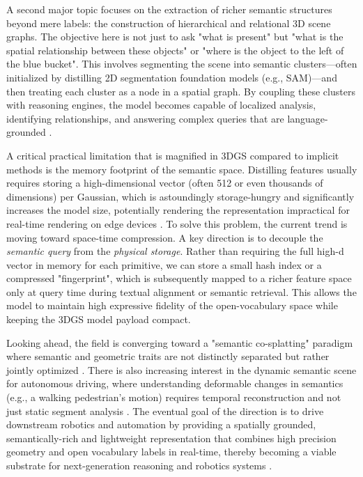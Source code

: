 \documentclass[11pt,a4paper]{article}
\begin{document}
A second major topic focuses on the extraction of richer semantic structures beyond mere labels: the construction of hierarchical and relational 3D scene graphs. The objective here is not just to ask "what is present" but "what is the spatial relationship between these objects" or "where is the object to the left of the blue bucket". This involves segmenting the scene into semantic clusters---often initialized by distilling 2D segmentation foundation models (e.g., SAM)---and then treating each cluster as a node in a spatial graph. By coupling these clusters with reasoning engines, the model becomes capable of localized analysis, identifying relationships, and answering complex queries that are language-grounded \cite{arxiv:2508.09977v5}.

A critical practical limitation that is magnified in 3DGS compared to implicit methods is the memory footprint of the semantic space. Distilling features usually requires storing a high-dimensional vector (often 512 or even thousands of dimensions) per Gaussian, which is astoundingly storage-hungry and significantly increases the model size, potentially rendering the representation impractical for real-time rendering on edge devices \cite{arxiv:2502.19457v1}. To solve this problem, the current trend is moving toward space-time compression. A key direction is to decouple the \emph{semantic query} from the \emph{physical storage}. Rather than requiring the full high-d vector in memory for each primitive, we can store a small hash index or a compressed "fingerprint", which is subsequently mapped to a richer feature space only at query time during textual alignment or semantic retrieval. This allows the model to maintain high expressive fidelity of the open-vocabulary space while keeping the 3DGS model payload compact.

Looking ahead, the field is converging toward a "semantic co-splatting" paradigm where semantic and geometric traits are not distinctly separated but rather jointly optimized \cite{arxiv:2508.09977v5}. There is also increasing interest in the dynamic semantic scene for autonomous driving, where understanding deformable changes in semantics (e.g., a walking pedestrian's motion) requires temporal reconstruction and not just static segment analysis \cite{arxiv:2411.16816v3,arxiv:2410.12262v2}. The eventual goal of the direction is to drive downstream robotics and automation by providing a spatially grounded, semantically-rich and lightweight representation that combines high precision geometry and open vocabulary labels in real-time, thereby becoming a viable substrate for next-generation reasoning and robotics systems \cite{arxiv:2410.12262v2}.
\end{document}
